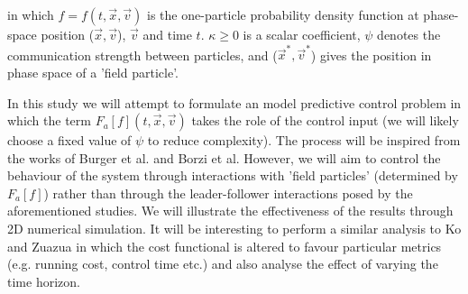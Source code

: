 \documentclass[.../main.tex]{subfiles}
\begin{document}
    in which $f = f(t, \Vec{x}, \Vec{v})$ is the one-particle probability density function at
    phase-space position ($\Vec{x}, \Vec{v}$), $\Vec{v}$ and time $t$. $\kappa \geq 0$ is a scalar
    coefficient, $\psi$ denotes the communication strength between particles, and ($\Vec{x}^*, \Vec
    {v}^*$) gives the position in phase space of a 'field particle'.

    In this study we will attempt to formulate an model predictive control problem in which the term
    $F_a[f] (t, \Vec{x}, \Vec{v})$ takes the role of the control input (we will likely choose a
    fixed value of $\psi$ to reduce complexity). The process will be inspired from the works of
    Burger et al. \cite{Berger2019} and Borzi et al. \cite{Borzi2014} However, we will aim to
    control the behaviour of the system through interactions with 'field particles' (determined by
    $F_a[f]$) rather than through the leader-follower interactions posed by the aforementioned
    studies. We will illustrate the effectiveness of the results through 2D numerical simulation. It
    will be interesting to perform a similar analysis to Ko and Zuazua \cite{Ko2019} in which the
    cost functional is altered to favour particular metrics  (e.g. running cost, control time etc.)
    and also analyse the effect of varying the time horizon.
\end{document}
